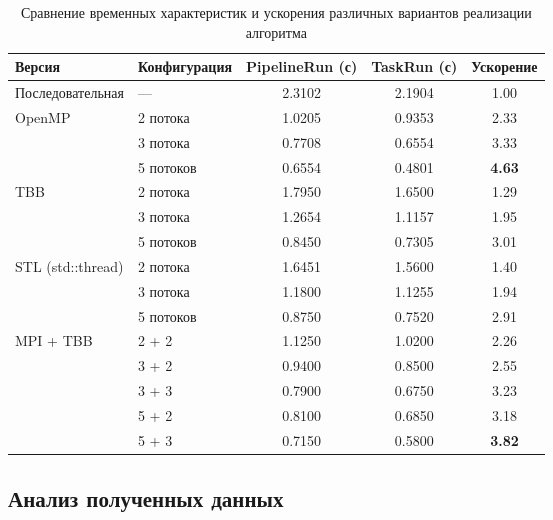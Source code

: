 \documentclass[14pt,a4paper]{extarticle}
\begin{document}
\renewcommand{\arraystretch}{1.3}
\begin{table}[H]
\centering
\footnotesize
\begin{tabularx}{\textwidth}{|X|l|c|c|c|}
\hline
\textbf{Версия} & \textbf{Конфигурация} & \textbf{PipelineRun (с)} & \textbf{TaskRun (с)} & \textbf{Ускорение} \\
\hline
Последовательная & — & 2.3102 & 2.1904 & 1.00 \\
\hline
\multirow{3}{*}{OpenMP} 
  & 2 потока & 1.0205 & 0.9353 & 2.33 \\
  & 3 потока & 0.7708 & 0.6554 & 3.33 \\
  & 5 потоков & 0.6554 & 0.4801 & \textbf{4.63} \\
\hline
\multirow{3}{*}{TBB} 
  & 2 потока & 1.7950 & 1.6500 & 1.29 \\
  & 3 потока & 1.2654 & 1.1157 & 1.95 \\
  & 5 потоков & 0.8450 & 0.7305 & 3.01 \\
\hline
\multirow{3}{*}{STL (std::thread)} 
  & 2 потока & 1.6451 & 1.5600 & 1.40 \\
  & 3 потока & 1.1800 & 1.1255 & 1.94 \\
  & 5 потоков & 0.8750 & 0.7520 & 2.91 \\
\hline
\multirow{5}{*}{MPI + TBB} 
  & 2 + 2 & 1.1250 & 1.0200 & 2.26 \\
  & 3 + 2 & 0.9400 & 0.8500 & 2.55 \\
  & 3 + 3 & 0.7900 & 0.6750 & 3.23 \\
  & 5 + 2 & 0.8100 & 0.6850 & 3.18 \\
  & 5 + 3 & 0.7150 & 0.5800 & \textbf{3.82} \\
\hline
\end{tabularx}
\caption{Сравнение временных характеристик и ускорения различных вариантов реализации алгоритма}
\end{table}

\subsection{Анализ полученных данных}
\end{document}
